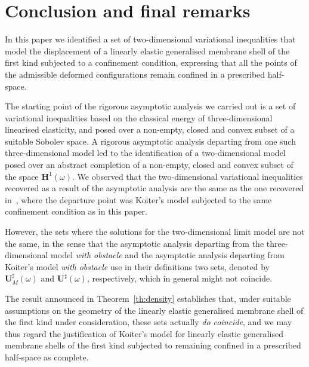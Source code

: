 \documentclass{amsart}
\begin{document}
\section*{Conclusion and final remarks}

In this paper we identified a set of two-dimensional variational inequalities that model the displacement of a linearly elastic generalised membrane shell of the first kind subjected to a confinement condition, expressing that all the points of the admissible deformed configurations remain confined in a prescribed half-space.

The starting point of the rigorous asymptotic analysis we carried out is a set of variational inequalities based on the classical energy of three-dimensional linearised elasticity, and posed over a non-empty, closed and convex subset of a suitable Sobolev space.
A rigorous asymptotic analysis departing from one such three-dimensional model led to the identification of a two-dimensional model posed over an abstract completion of a non-empty, closed and convex subset of the space $\bm{H}^1(\omega)$. We observed that the two-dimensional variational inequalities recovered as a result of the asymptotic analysis are the same as the one recovered in~\cite{CiaPie2018bCR,CiaPie2018b}, where the departure point was Koiter's model subjected to the same confinement condition as in this paper.

However, the sets where the solutions for the two-dimensional limit model are not the same, in the sense that the asymptotic analysis departing from the three-dimensional model \emph{with obstacle} and the asymptotic analysis departing from Koiter's model \emph{with obstacle} use in their definitions two sets, denoted by $\bm{U}_M^\sharp(\omega)$ and $\bm{U}^\sharp(\omega)$, respectively, which in general might not coincide.

The result announced in Theorem~\ref{th:density} establishes that, under suitable assumptions on the geometry of the linearly elastic generalised membrane shell of the first kind under consideration, these sets actually \emph{do coincide}, and we may thus regard the justification of Koiter's model for linearly elastic generalised membrane shells of the first kind subjected to remaining confined in a prescribed half-space as complete.
\end{document}
